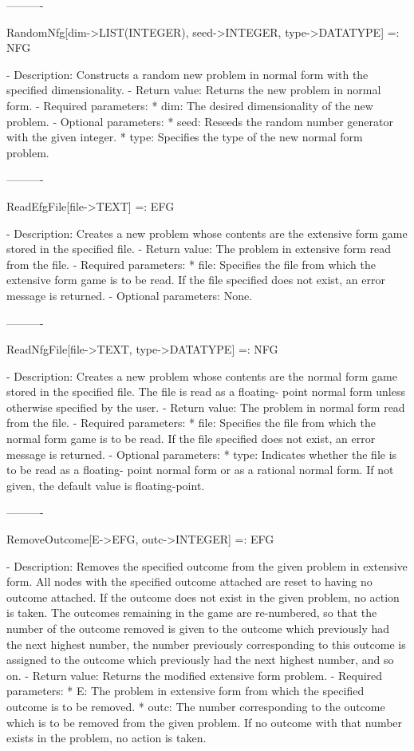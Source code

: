 ----------

RandomNfg[dim->LIST(INTEGER), {seed->INTEGER}, {type->DATATYPE}] =: NFG

   -	Description:  Constructs a random new problem in normal form with the 
	specified dimensionality.
   -	Return value:  Returns the new problem in normal form.
   -	Required parameters:
	  *  dim:  The desired dimensionality of the new problem.
   -	Optional parameters:
	  *  seed:  Reseeds the random number generator with the given integer.
	  *  type:  Specifies the type of the new normal form problem.

----------

ReadEfgFile[file->TEXT] =: EFG

   -	Description:  Creates a new problem whose contents are the extensive 
	form game stored in the specified file.
   -	Return value:  The problem in extensive form read from the file.
   -	Required parameters:
	  *  file:  Specifies the file from which the extensive form game is to
		be read.  If the file specified does not exist, an error 
		message is returned.
   -	Optional parameters:  None.

----------

ReadNfgFile[file->TEXT, {type->DATATYPE}] =: NFG

   -	Description:  Creates a new problem whose contents are the normal form
	game stored in the specified file.  The file is read as a floating-
	point normal form unless otherwise specified by the user.
   -	Return value:  The problem in normal form read from the file.
   -	Required parameters:
	  *  file:  Specifies the file from which the normal form game is to be
		read.  If the file specified does not exist, an error message
		is returned.
   -	Optional parameters:
	  *  type:  Indicates whether the file is to be read as a floating-
		point normal form or as a rational normal form.  If not given,
		the default value is floating-point.

----------

RemoveOutcome[E->EFG, outc->INTEGER] =: EFG

   -	Description:  Removes the specified outcome from the given problem in
	extensive form.  All nodes with the specified outcome attached are 
	reset to having no outcome attached.  If the outcome does not exist in
	the given problem, no action is taken.  The outcomes remaining in the 
	game are re-numbered, so that the number of the outcome removed is 
	given to the outcome which previously had the next highest number, the
	number previously corresponding to this outcome is assigned to the
	outcome which previously had the next highest number, and so on.  
   -	Return value:  Returns the modified extensive form problem.
   -	Required parameters:
	  *  E:  The problem in extensive form from which the specified outcome
		is to be removed.
	  *  outc:  The number corresponding to the outcome which is to be 
		removed from the given problem.  If no outcome with that number
		exists in the problem, no action is taken.


